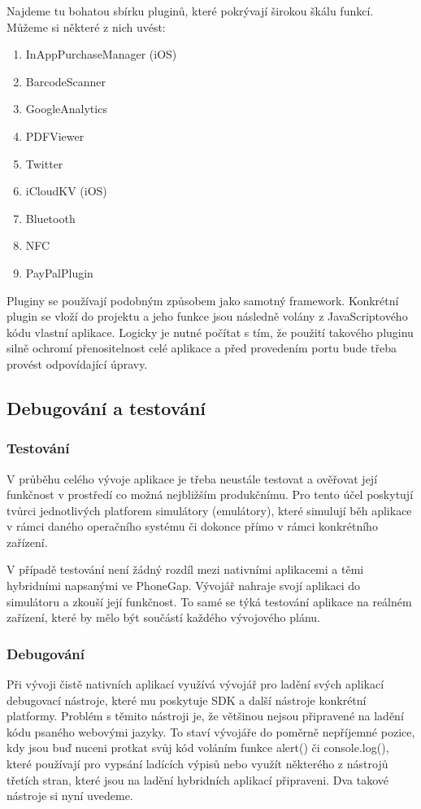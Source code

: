 Najdeme tu bohatou sbírku pluginů, které pokrývají širokou škálu funkcí. Můžeme si některé z nich uvést:

\begin{enumerate}
	\item InAppPurchaseManager (iOS)
	\item BarcodeScanner
	\item GoogleAnalytics
	\item PDFViewer
	\item Twitter
	\item iCloudKV (iOS)
	\item Bluetooth
	\item NFC
	\item PayPalPlugin
\end{enumerate}

Pluginy se používají podobným způsobem jako samotný framework. Konkrétní plugin se vloží do projektu a jeho funkce jsou následně volány z JavaScriptového kódu vlastní aplikace. Logicky je nutné počítat s tím, že použití takového pluginu silně ochromí přenositelnost celé aplikace a před provedením portu bude třeba provést odpovídající úpravy.

\subsection{Debugování a testování} \label{Sec:DebugaTest}
\subsubsection{Testování}
V průběhu celého vývoje aplikace je třeba neustále testovat a ověřovat její funkčnost v prostředí co možná nejbližším produkčnímu. Pro tento účel poskytují tvůrci jednotlivých platforem simulátory (emulátory), které simulují běh aplikace v rámci daného operačního systému či dokonce přímo v rámci konkrétního zařízení.

V případě testování není žádný rozdíl mezi nativními aplikacemi a těmi hybridními napsanými ve PhoneGap. Vývojář nahraje svojí aplikaci do simulátoru a zkouší její funkčnost. To samé se týká testování aplikace na reálném zařízení, které by mělo být součástí každého vývojového plánu.

\subsubsection{Debugování}
Při vývoji čistě nativních aplikací využívá vývojář pro ladění svých aplikací debugovací nástroje, které mu poskytuje SDK a další nástroje konkrétní platformy. Problém s těmito nástroji je, že většinou nejsou připravené na ladění kódu psaného webovými jazyky. To staví vývojáře do poměrně nepříjemné pozice, kdy jsou buď nuceni protkat svůj kód voláním funkce alert() či console.log(), které používají pro vypsání ladících výpisů nebo využít některého z nástrojů třetích stran, které jsou na ladění hybridních aplikací připraveni. Dva takové nástroje si nyní uvedeme.

